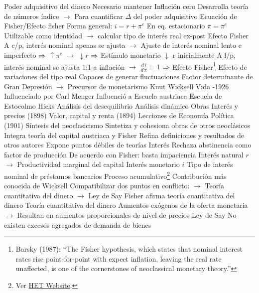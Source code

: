 \documentclass{nuevotema}
\begin{document}
\begin{esquemal}
				\4 Poder adquisitivo del dinero
				\4[] Necesario mantener
				\4[] Inflación cero
				\4[] Desarrolla teoría de números índice
				\4[] $\to$ Para cuantificar $\Delta$ del poder adquisitivo
				\4 Ecuación de Fisher/Efecto fisher
				\4[] Forma general: $i = r + \pi^e$
				\4[] En eq. estacionario $\pi = \pi^e$
				\4[] Utilizable como identidad
				\4[] $\to$ calcular tipo de interés real ex-post
				\4 Efecto Fisher
				\4[] A c/p, interés nominal apenas se ajusta
				\4[] $\to$ Ajuste de interés nominal lento e imperfecto
				\4[] $\Rightarrow$ $\uparrow \pi^e$ $\to$ $\downarrow r$
				\4[] $\Rightarrow$ Estímulo monetario $\downarrow$ r inicialmente
				\4[] A l/p, interés nominal se ajusta 1:1 a inflación
				\4[] $\to$  $\frac{d \, i}{d \, \pi} = 1$
				\4[] $\Rightarrow$ Efecto Fisher\footnote{Barsky (1987): ``The Fisher hypothesis, which states that nominal interest rates rise point-for-point with expect inflation, leaving the real rate unaffected, is one of the cornerstones of neoclassical monetary theory.''}
				\4 Efecto de variaciones del tipo real
				\4[] Capaces de generar fluctuaciones
				\4[] Factor determinante de Gran Depresión
				\4[] $\to$ Precursor de monetarismo
		\2 Knut Wicksell
			\3 Vida
				-1926
			\3 Influenciado por
				\4 Carl Menger
			\3 Influenció a
				\4 Escuela austriaca
				\4 Escuela de Estocolmo
				\4 Hicks
				\4 Análisis del desequilibrio
				\4 Análisis dinámico
			\3 Obras
				\4 Interés y precios (1898)
				\4 Valor, capital y renta (1894)
				\4 Lecciones de Economía Política (1901)
			\3 Síntesis del neoclasicismo
				\4 Sintetiza y cohesiona obras de otros neoclásicos
				\4 Integra teoría del capital austriaca y Fisher
				\4 Refina definiciones y resultados de otros autores
				\4 Expone puntos débiles de teorías
			\3 Interés
				\4 Rechaza abstinencia como factor de producción
				\4 De acuerdo con Fisher: basta impaciencia
				\4 Interés natural $r$
				\4[] $\to$ Productividad marginal del capital
				\4 Interés monetario $i$
				\4[] Tipo de interés nominal de préstamos bancarios
			\3 Proceso acumulativo\footnote{Ver \href{https://www.hetwebsite.net/het/essays/money/cumulative.htm}{HET Website}.}
				\4 Contribución más conocida de Wicksell
				\4 Compatibilizar dos puntos en conflicto:
				\4[] $\to$ Teoría cuantitativa del dinero
				\4[] $\to$ Ley de Say
				\4[] Fisher afirma teoría cuantitativa del dinero
				\4 Teoría cuantitativa del dinero
				\4[] Aumentos exógenos de la oferta monetaria
				\4[] $\to$ Resultan en aumentos proporcionales de nivel de precios
				\4 Ley de Say
				\4[] No existen excesos agregados de demanda de bienes

\end{esquemal}
\end{document}

